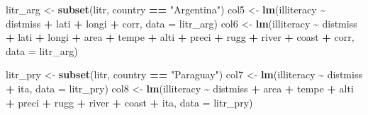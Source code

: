 \documentclass[
  a4paper,
]{article}
\newenvironment{Shaded}{\begin{snugshade}}{\end{snugshade}}
\newcommand{\AttributeTok}[1]{\textcolor[rgb]{0.13,0.29,0.53}{#1}}
\newcommand{\FunctionTok}[1]{\textcolor[rgb]{0.13,0.29,0.53}{\textbf{#1}}}
\newcommand{\NormalTok}[1]{#1}
\newcommand{\OtherTok}[1]{\textcolor[rgb]{0.56,0.35,0.01}{#1}}
\newcommand{\SpecialCharTok}[1]{\textcolor[rgb]{0.81,0.36,0.00}{\textbf{#1}}}
\newcommand{\StringTok}[1]{\textcolor[rgb]{0.31,0.60,0.02}{#1}}
\begin{document}
\begin{Shaded}
\begin{Highlighting}[]
\NormalTok{litr\_arg }\OtherTok{\textless{}{-}} \FunctionTok{subset}\NormalTok{(litr, country }\SpecialCharTok{==} \StringTok{"Argentina"}\NormalTok{)}
\NormalTok{col5 }\OtherTok{\textless{}{-}} \FunctionTok{lm}\NormalTok{(illiteracy }\SpecialCharTok{\textasciitilde{}}\NormalTok{ distmiss }\SpecialCharTok{+}\NormalTok{ lati }\SpecialCharTok{+}\NormalTok{ longi }\SpecialCharTok{+}\NormalTok{ corr, }\AttributeTok{data =}\NormalTok{ litr\_arg)}
\NormalTok{col6 }\OtherTok{\textless{}{-}} \FunctionTok{lm}\NormalTok{(illiteracy }\SpecialCharTok{\textasciitilde{}}\NormalTok{ distmiss }\SpecialCharTok{+}\NormalTok{ lati }\SpecialCharTok{+}\NormalTok{ longi }\SpecialCharTok{+}\NormalTok{ area }\SpecialCharTok{+}\NormalTok{ tempe }\SpecialCharTok{+}\NormalTok{ alti }\SpecialCharTok{+}\NormalTok{ preci }\SpecialCharTok{+}\NormalTok{ rugg }\SpecialCharTok{+}
\NormalTok{    river }\SpecialCharTok{+}\NormalTok{ coast }\SpecialCharTok{+}\NormalTok{ corr, }\AttributeTok{data =}\NormalTok{ litr\_arg)}

\NormalTok{litr\_pry }\OtherTok{\textless{}{-}} \FunctionTok{subset}\NormalTok{(litr, country }\SpecialCharTok{==} \StringTok{"Paraguay"}\NormalTok{)}
\NormalTok{col7 }\OtherTok{\textless{}{-}} \FunctionTok{lm}\NormalTok{(illiteracy }\SpecialCharTok{\textasciitilde{}}\NormalTok{ distmiss }\SpecialCharTok{+}\NormalTok{ ita, }\AttributeTok{data =}\NormalTok{ litr\_pry)}
\NormalTok{col8 }\OtherTok{\textless{}{-}} \FunctionTok{lm}\NormalTok{(illiteracy }\SpecialCharTok{\textasciitilde{}}\NormalTok{ distmiss }\SpecialCharTok{+}\NormalTok{ area }\SpecialCharTok{+}\NormalTok{ tempe }\SpecialCharTok{+}\NormalTok{ alti }\SpecialCharTok{+}\NormalTok{ preci }\SpecialCharTok{+}\NormalTok{ rugg }\SpecialCharTok{+}\NormalTok{ river }\SpecialCharTok{+}\NormalTok{ coast }\SpecialCharTok{+}
\NormalTok{    ita, }\AttributeTok{data =}\NormalTok{ litr\_pry)}
\end{Highlighting}
\end{Shaded}
\end{document}
